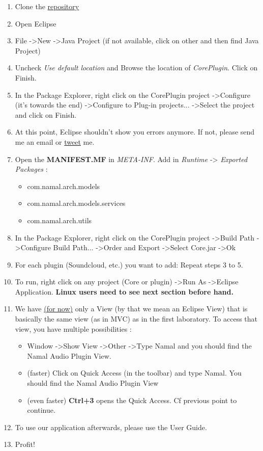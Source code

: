 \documentclass{report}
\begin{document}
\begin{enumerate}
\item Clone the \href{https://github.com/cnamal/arch-LOG8430}{repository}
\item Open Eclipse
\item File -\textgreater New -\textgreater Java Project (if not available, click on other and then find Java Project)
\item Uncheck \textit{Use default location} and Browse the location of \textit{CorePlugin}. Click on Finish. 
\item In the Package Explorer, right click on the CorePlugin project -\textgreater Configure (it's towards the end) -\textgreater Configure to Plug-in projects... -\textgreater Select the project and click on Finish.
\item At this point, Eclipse shouldn't show you errors anymore. If not, please send me an email or \href{https://twitter.com/cnamalgamuwa}{tweet} me.
\item Open the \textbf{MANIFEST.MF} in \textit{META-INF}. Add in \textit{Runtime} -\textgreater \textit{ Exported Packages} : 
\begin{itemize}
\item com.namal.arch.models
\item com.namal.arch.models.services
\item com.namal.arch.utils
\end{itemize}
\item In the Package Explorer, right click on the CorePlugin project -\textgreater Build Path -\textgreater Configure Build Path... -\textgreater Order and Export -\textgreater Select Core.jar -\textgreater Ok

\item For each plugin (Soundcloud, etc.) you want to add: Repeat steps 3 to 5.
\item To run, right click on any project (Core or plugin) -\textgreater Run As -\textgreater Eclipse Application. \textbf{Linux users need to see next section before hand.}
\item We have \hyperref[lim::toolbar]{(for now)} only a View (by that we mean an Eclipse View) that is basically the same view (as in MVC) as in the first laboratory. To access that view, you have multiple possibilities :
\begin{itemize}
\item Window -\textgreater Show View -\textgreater Other -\textgreater Type Namal and you should find the Namal Audio Plugin View.
\item (faster) Click on Quick Access (in the toolbar) and type Namal. You should find the Namal Audio Plugin View
\item (even faster) \textbf{Ctrl+3} opens the Quick Access. Cf previous point to continue.
\end{itemize}
\item To use our application afterwards, please use the User Guide.
\item Profit!
\end{enumerate}
\end{document}

